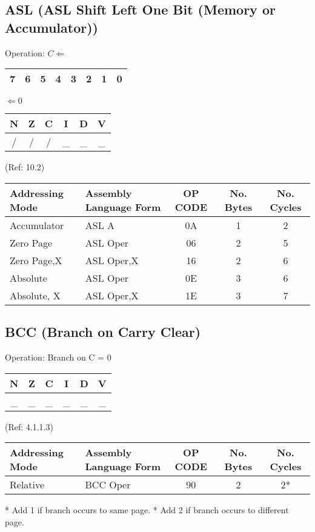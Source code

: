 \documentclass{article}
\begin{document}
  \subsection{ASL (ASL Shift Left One Bit (Memory or Accumulator))}
  Operation:  $C \Leftarrow$ \begin{tabular}{|c|c|c|c|c|c|c|c|}\hline7&6&5&4&3&2&1&0\\\hline\end{tabular} $\Leftarrow 0$
  \begin{table}[H]
  \centering
  \begin{tabular}{|c c c c c c|}
  \hline
  N&Z&C&I&D&V\\
  \hline
  /&/&/&\_&\_&\_\\
  \hline
  \end{tabular}
  \end{table}
                                 (Ref: 10.2)
  \begin{table}[H]
  \centering
  \begin{tabular}{|l|l|c|c|c|}
  \hline
  Addressing Mode & Assembly Language Form & OP CODE & No. Bytes & No. Cycles\\
  \hline
  Accumulator   &   ASL A               &    0A   &    1    &    2\\
  Zero Page     &   ASL Oper            &    06   &    2    &    5\\
  Zero Page,X   &   ASL Oper,X          &    16   &    2    &    6\\
  Absolute      &   ASL Oper            &    0E   &    3    &    6\\
  Absolute, X   &   ASL Oper,X          &    1E   &    3    &    7\\
  \hline
  \end{tabular}
  \end{table}

  \subsection{BCC (Branch on Carry Clear)}
  Operation:  Branch on C = 0
  \begin{table}[H]
  \centering
  \begin{tabular}{|c c c c c c|}
  \hline
  N&Z&C&I&D&V\\
  \hline
  \_&\_&\_&\_&\_&\_\\
  \hline
  \end{tabular}
  \end{table}
                               (Ref: 4.1.1.3)
  \begin{table}[H]
  \centering
  \begin{tabular}{|l|l|c|c|c|}
  \hline
  Addressing Mode & Assembly Language Form & OP CODE & No. Bytes & No. Cycles\\
  \hline
  Relative      &   BCC Oper            &    90   &    2    &    2*\\
  \hline
  \end{tabular}
  \end{table}
  * Add 1 if branch occurs to same page.
  * Add 2 if branch occurs to different page.
\end{document}
